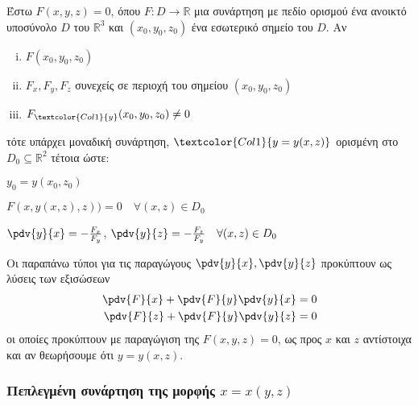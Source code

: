     Έστω $ F(x,y,z) = 0 $, όπου $F\colon D \to \mathbb{R}$ μια συνάρτηση με πεδίο ορισμού 
    ένα ανοικτό υποσύνολο $ D $ του $ \mathbb{R}^{3}  $ και $ (x_0,y_0,z_0) $ ένα 
    εσωτερικό σημείο του $ D $. Αν
    \begin{enumerate}[(i)]
      \item $ F(x_0,y_0,z_0) $
      \item $ F_x, F_y, F_z $ συνεχείς σε περιοχή του σημείου $ (x_0,y_0,z_0) $
      \item $ F_{\textcolor{Col1}{y}}(x_0,y_0,z_0) \neq 0 $
    \end{enumerate}
    τότε υπάρχει μοναδική συνάρτηση, $ \textcolor{Col1}{y=y(x,z)} $ ορισμένη στο 
    $ D_0 \subseteq \mathbb{R}^{2} $ τέτοια ώστε:
    \begin{myitemize}
      \item $ y_0 = y(x_0,z_0) $
      \item $ F(x,y(x,z),z)) = 0  \quad \forall (x,z) \in  D_0 $
      \item $ \pdv{y}{x} = - \frac{F_x}{F_y} $, $ \pdv{y}{z} = - \frac{F_z}{F_y}\quad 
        \forall (x,z) \in D_0$
    \end{myitemize}

    \begin{rem}
      Οι παραπάνω τύποι για τις παραγώγους $ \pdv{y}{x}, \pdv{y}{z} $ προκύπτουν 
      ως λύσεις των εξισώσεων  
      \begin{align*}	
        \pdv{F}{x} + \pdv{F}{y}\pdv{y}{x} &= 0 \\
        \pdv{F}{z} + \pdv{F}{y}\pdv{y}{z} &= 0 
      \end{align*}
      οι οποίες προκύπτουν με παραγώγιση της $ F(x,y,z) = 0 $, ως προς $x$ και $z$ 
      αντίστοιχα και  αν θεωρήσουμε ότι $ y=y(x,z) $.
    \end{rem}

    \subsubsection{Πεπλεγμένη συνάρτηση της μορφής \ensuremath{x=x(y,z)}}

